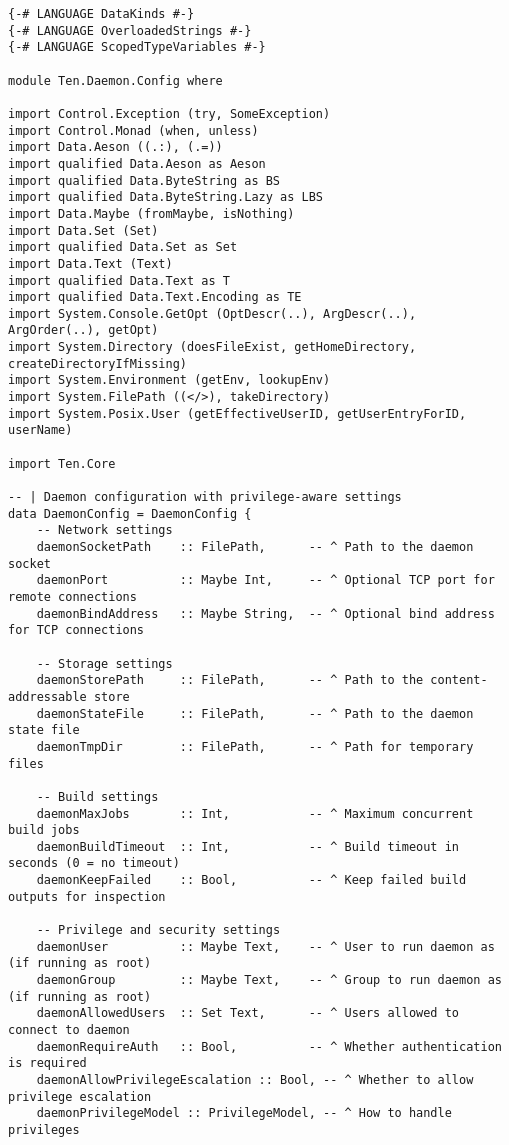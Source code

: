 \documentclass{article}
\begin{document}
\begin{tcolorbox}[title=Ten/Daemon/Config.hs Changes]
\begin{verbatim}
{-# LANGUAGE DataKinds #-}
{-# LANGUAGE OverloadedStrings #-}
{-# LANGUAGE ScopedTypeVariables #-}

module Ten.Daemon.Config where

import Control.Exception (try, SomeException)
import Control.Monad (when, unless)
import Data.Aeson ((.:), (.=))
import qualified Data.Aeson as Aeson
import qualified Data.ByteString as BS
import qualified Data.ByteString.Lazy as LBS
import Data.Maybe (fromMaybe, isNothing)
import Data.Set (Set)
import qualified Data.Set as Set
import Data.Text (Text)
import qualified Data.Text as T
import qualified Data.Text.Encoding as TE
import System.Console.GetOpt (OptDescr(..), ArgDescr(..), ArgOrder(..), getOpt)
import System.Directory (doesFileExist, getHomeDirectory, createDirectoryIfMissing)
import System.Environment (getEnv, lookupEnv)
import System.FilePath ((</>), takeDirectory)
import System.Posix.User (getEffectiveUserID, getUserEntryForID, userName)

import Ten.Core

-- | Daemon configuration with privilege-aware settings
data DaemonConfig = DaemonConfig {
    -- Network settings
    daemonSocketPath    :: FilePath,      -- ^ Path to the daemon socket
    daemonPort          :: Maybe Int,     -- ^ Optional TCP port for remote connections
    daemonBindAddress   :: Maybe String,  -- ^ Optional bind address for TCP connections

    -- Storage settings
    daemonStorePath     :: FilePath,      -- ^ Path to the content-addressable store
    daemonStateFile     :: FilePath,      -- ^ Path to the daemon state file
    daemonTmpDir        :: FilePath,      -- ^ Path for temporary files

    -- Build settings
    daemonMaxJobs       :: Int,           -- ^ Maximum concurrent build jobs
    daemonBuildTimeout  :: Int,           -- ^ Build timeout in seconds (0 = no timeout)
    daemonKeepFailed    :: Bool,          -- ^ Keep failed build outputs for inspection

    -- Privilege and security settings
    daemonUser          :: Maybe Text,    -- ^ User to run daemon as (if running as root)
    daemonGroup         :: Maybe Text,    -- ^ Group to run daemon as (if running as root)
    daemonAllowedUsers  :: Set Text,      -- ^ Users allowed to connect to daemon
    daemonRequireAuth   :: Bool,          -- ^ Whether authentication is required
    daemonAllowPrivilegeEscalation :: Bool, -- ^ Whether to allow privilege escalation
    daemonPrivilegeModel :: PrivilegeModel, -- ^ How to handle privileges


\end{verbatim}
\end{tcolorbox}
\end{document}
